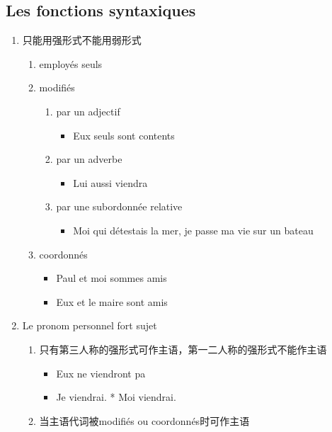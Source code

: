 \documentclass[UTF8]{report}
\begin{document}
\subsection{Les fonctions syntaxiques}
\begin{enumerate}
    \item 只能用强形式不能用弱形式
    \begin{enumerate}
        \item employés seuls
        \item modifiés
        \begin{enumerate}
            \item par un adjectif
            \begin{itemize}
                \item Eux seuls sont contents
            \end{itemize}
            \item par un adverbe
            \begin{itemize}
                \item Lui aussi viendra
            \end{itemize}
            \item par une subordonnée relative
            \begin{itemize}
                \item Moi qui détestais la mer, je passe ma vie sur un bateau
            \end{itemize}
        \end{enumerate}
        \item coordonnés
        \begin{itemize}
            \item Paul et moi sommes amis
            \item Eux et le maire sont amis
        \end{itemize}
    \end{enumerate}
    \item Le pronom personnel fort sujet
    \begin{enumerate}
        \item 只有第三人称的强形式可作主语，第一二人称的强形式不能作主语
        \begin{itemize}
            \item Eux ne viendront pa
            \item Je viendrai. * Moi viendrai.
        \end{itemize}
        \item 当主语代词被modifiés ou coordonnés时可作主语

\end{enumerate}
\end{enumerate}
\end{document}
